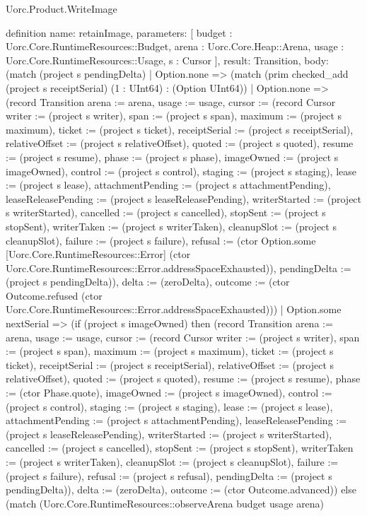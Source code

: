\begin{lexlean}{Uorc.Product.WriteImage}
\begin{semanticmodule}
definition{
  name: retainImage,
  parameters: [
    budget : Uorc.Core.RuntimeResources::Budget,
    arena : Uorc.Core.Heap::Arena,
    usage : Uorc.Core.RuntimeResources::Usage,
    s : Cursor
  ],
  result: Transition,
  body: (match (project s pendingDelta)
    | Option.none => (match (prim checked_add (project s receiptSerial) (1 : UInt64) : (Option UInt64))
      | Option.none => (record Transition {arena := arena, usage := usage, cursor := (record Cursor {writer := (project s writer), span := (project s span), maximum := (project s maximum), ticket := (project s ticket), receiptSerial := (project s receiptSerial), relativeOffset := (project s relativeOffset), quoted := (project s quoted), resume := (project s resume), phase := (project s phase), imageOwned := (project s imageOwned), control := (project s control), staging := (project s staging), lease := (project s lease), attachmentPending := (project s attachmentPending), leaseReleasePending := (project s leaseReleasePending), writerStarted := (project s writerStarted), cancelled := (project s cancelled), stopSent := (project s stopSent), writerTaken := (project s writerTaken), cleanupSlot := (project s cleanupSlot), failure := (project s failure), refusal := (ctor Option.some [Uorc.Core.RuntimeResources::Error] (ctor Uorc.Core.RuntimeResources::Error.addressSpaceExhausted)), pendingDelta := (project s pendingDelta)}), delta := (zeroDelta), outcome := (ctor Outcome.refused (ctor Uorc.Core.RuntimeResources::Error.addressSpaceExhausted))})
      | Option.some nextSerial => (if (project s imageOwned) then (record Transition {arena := arena, usage := usage, cursor := (record Cursor {writer := (project s writer), span := (project s span), maximum := (project s maximum), ticket := (project s ticket), receiptSerial := (project s receiptSerial), relativeOffset := (project s relativeOffset), quoted := (project s quoted), resume := (project s resume), phase := (ctor Phase.quote), imageOwned := (project s imageOwned), control := (project s control), staging := (project s staging), lease := (project s lease), attachmentPending := (project s attachmentPending), leaseReleasePending := (project s leaseReleasePending), writerStarted := (project s writerStarted), cancelled := (project s cancelled), stopSent := (project s stopSent), writerTaken := (project s writerTaken), cleanupSlot := (project s cleanupSlot), failure := (project s failure), refusal := (project s refusal), pendingDelta := (project s pendingDelta)}), delta := (zeroDelta), outcome := (ctor Outcome.advanced)}) else (match (Uorc.Core.RuntimeResources::observeArena budget usage arena)
}
\end{semanticmodule}
\end{lexlean}
